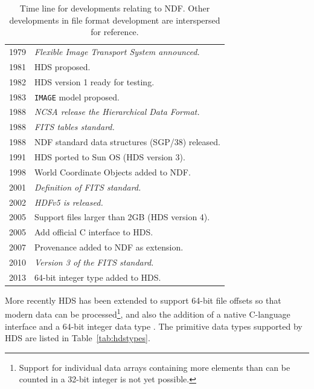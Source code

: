 \documentclass[final,authoryear,5p,times,twocolumn]{elsarticle}
\begin{document}
\begin{table}
\caption{Time line for developments relating to NDF. Other
  developments in file format development are interspersed
  for reference.}
\label{tab:timeline}
\begin{tabular}{|l|l|}
\hline
1979 & \emph{Flexible Image Transport System announced.}\\
1981 & HDS proposed. \\
1982 & HDS version 1 ready for testing. \\
1983 & \texttt{IMAGE} model proposed. \\
1988 & \emph{NCSA release the Hierarchical Data Format.}\\
1988 & \emph{FITS tables standard.}\\
1988 & NDF  standard data structures (SGP/38) released.\\
1991 & HDS ported to Sun OS (HDS version 3).\\
1998 & World Coordinate Objects added to NDF.\\
2001 & \emph{Definition of FITS standard.}\\
2002 & \emph{HDFv5 is released.}\\
2005 & Support files larger than 2GB (HDS version 4).\\
2005 & Add official C interface to HDS.\\
2007 & Provenance added to NDF as extension.\\
2010 & \emph{Version 3 of the FITS standard.}\\
2013 & 64-bit integer type added to HDS.\\
\hline
\end{tabular}
\begin{center}
\end{center}
\end{table}

More recently HDS has been extended to support 64-bit file
offsets so that modern data can be processed\footnote{Support for
  individual data  arrays containing more elements than can be counted
  in a 32-bit integer is not yet possible.}, and also the addition of
a native C-language interface and a 64-bit integer data type
\citep{P82_adassxxiii}. The primitive data types supported by HDS are
listed in Table~\ref{tab:hdstypes}.
\end{document}
